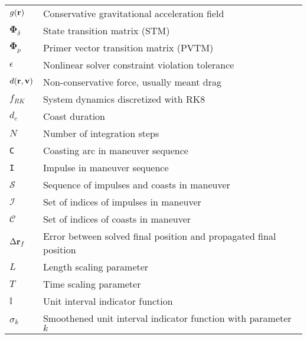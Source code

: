 \begin{longtable}{ll}
\(g(\mathbf{r})\) & Conservative gravitational acceleration field \\
\(\mathbf{\Phi}_\delta\) & State transition matrix (STM) \\
\(\mathbf{\Phi}_p\) & Primer vector transition matrix (PVTM) \\
\(\epsilon\) & Nonlinear solver constraint violation tolerance \\
\(d(\mathbf{r}, \mathbf{v})\) & Non-conservative force, usually meant drag \\
\(f_{RK}\) & System dynamics discretized with RK8 \\
\(d_c\) & Coast duration \\
\(N\) & Number of integration steps \\
\texttt{C} & Coasting arc in maneuver sequence \\
\texttt{I} & Impulse in maneuver sequence \\
\(\mathcal{S}\) & Sequence of impulses and coasts in maneuver \\
\(\mathcal{I}\) & Set of indices of impulses in maneuver \\
\(\mathcal{C}\) & Set of indices of coasts in maneuver \\
\(\Delta \mathbf{r}_f\) & Error between solved final position and propagated final position \\
\(L\) & Length scaling parameter \\
\(T\) & Time scaling parameter \\
\(\mathbb{I}\) & Unit interval indicator function \\
\(\sigma_k\) & Smoothened unit interval indicator function with parameter \(k\) \\
\end{longtable}

